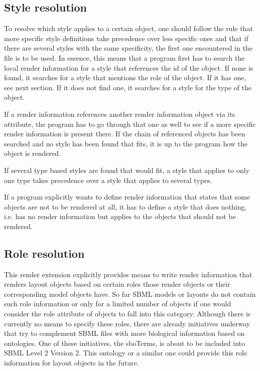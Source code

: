 \subsection{Style resolution}
To resolve which style applies to a certain object, one 
should follow the rule that more specific style definitions take precedence 
over less specific ones and that if there are several styles with the same 
specificity, the first one encountered in the file is to be used. In essence,
this means that a program first has to search the local render information for 
a style that references the id of the object. If none is found, it searches for 
a style that mentions the role of the object. If it has one, see next section. 
If it does not find one, it searches for a style for the type of the object. 

If a render information references another render information object via its 
 attribute, the program has to go through 
that one as well to see if a more specific render information is present there. 
If the chain of referenced \RenderInformation objects has been searched and no 
style has been found that fits, it is up to the program how the object is 
rendered. 

If several type based styles are found 
that would fit, a style that applies to only one type takes precedence over a 
style that applies to several types.

If a program explicitly wants to define render information that 
states that some objects are not to be rendered at all, it has to define a 
style that does nothing, i.e. has no render information but applies to the 
objects that should not be rendered. 


\subsection{Role resolution}
This render extension explicitly provides means to write render information
that renders layout objects based on certain roles those render objects or their
corresponding model objects have. So far SBML models or layouts do not contain
such role information or only for a limited number of objects if one would
consider the role attribute of \SpeciesReferenceGlyph objects to fall into this category.
Although there is currently no means to specify these roles, there are already
initiatives underway that try to complement SBML files with more biological
information based on ontologies. One of these initiatives, the sboTerms, is
about to be included into SBML Level 2 Version 2. This ontology or a similar
one could provide this role information for layout objects in the future.   

